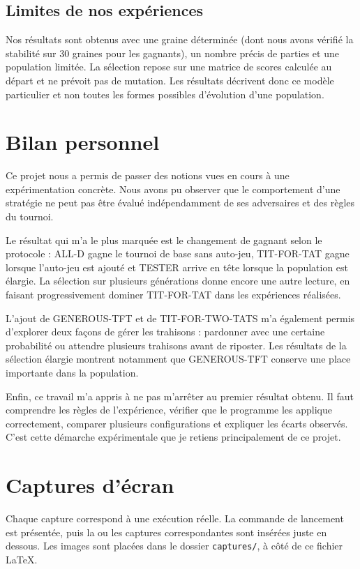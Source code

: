 \documentclass[10pt,a4paper]{article}
\begin{document}
\subsection{Limites de nos expériences}
Nos résultats sont obtenus avec une graine déterminée (dont nous avons vérifié la stabilité sur 30 graines pour les gagnants),
un nombre précis de parties et une population limitée. La sélection repose sur une matrice de scores calculée au départ et ne
prévoit pas de mutation. Les résultats décrivent donc ce modèle particulier et non toutes les formes possibles d'évolution
d'une population.

\section{Bilan personnel}
Ce projet nous a permis de passer des notions vues en cours à une expérimentation concrète. Nous avons pu observer que le
comportement d'une stratégie ne peut pas être évalué indépendamment de ses adversaires et des règles du tournoi.

Le résultat qui m'a le plus marquée est le changement de gagnant selon le protocole : ALL-D gagne le tournoi de base sans
auto-jeu, TIT-FOR-TAT gagne lorsque l'auto-jeu est ajouté et TESTER arrive en tête lorsque la population est élargie. La
sélection sur plusieurs générations donne encore une autre lecture, en faisant progressivement dominer TIT-FOR-TAT dans les
expériences réalisées.

L'ajout de GENEROUS-TFT et de TIT-FOR-TWO-TATS m'a également permis d'explorer deux façons de gérer les trahisons : pardonner
avec une certaine probabilité ou attendre plusieurs trahisons avant de riposter. Les résultats de la sélection élargie montrent
notamment que GENEROUS-TFT conserve une place importante dans la population.

Enfin, ce travail m'a appris à ne pas m'arrêter au premier résultat obtenu. Il faut comprendre les règles de l'expérience,
vérifier que le programme les applique correctement, comparer plusieurs configurations et expliquer les écarts observés. C'est
cette démarche expérimentale que je retiens principalement de ce projet.

\clearpage %
\section{Captures d'écran}\label{sec:captures}
Chaque capture correspond à une exécution réelle. La commande de lancement est
présentée, puis la ou les captures correspondantes sont insérées juste en dessous.
Les images sont placées dans le dossier \texttt{captures/}, à côté de ce fichier
LaTeX.
\end{document}

